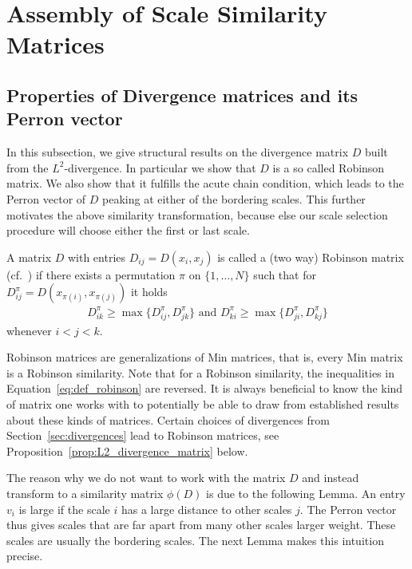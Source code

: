 
\section{Assembly of Scale Similarity Matrices}

\subsection{Properties of Divergence matrices and its Perron vector}

In this subsection, we give structural results on the divergence matrix $D$ built from the $L^2$-divergence. In particular we show that $D$ is a so called Robinson matrix. We also show that it fulfills the acute chain condition, which leads to the Perron vector of $D$ peaking at either of the bordering scales. This further motivates the above similarity transformation, because else our scale selection procedure will choose either the first or last scale.

\begin{Def}
    A matrix $D$ with entries $D_{ij}=D(x_i,x_j)$ is called a (two way) Robinson matrix (cf.~\cite{carmona_two_2024}) if there exists a permutation $\pi$ on $\{1,\dots,N\}$ such that for $D_{ij}^{\pi}=D(x_{\pi(i)},x_{\pi(j)})$ it holds
    \begin{align}\label{eq:def_robinson}
        D^{\pi}_{ik}\ge\max\{D^{\pi}_{ij},D^{\pi}_{jk}\}\text{ and }D_{ki}^{\pi}\ge\max\{D_{ji}^{\pi},D_{kj}^{\pi}\}
    \end{align}
    whenever $i<j<k$.
\end{Def}

Robinson matrices are generalizations of Min matrices, that is, every Min matrix is a Robinson similarity. Note that for a Robinson similarity, the inequalities in Equation~\eqref{eq:def_robinson} are reversed. It is always beneficial to know the kind of matrix one works with to potentially be able to draw from established results about these kinds of matrices. Certain choices of divergences from Section~\ref{sec:divergences} lead to Robinson matrices, see Proposition~\ref{prop:L2_divergence_matrix} below.

The reason why we do not want to work with the matrix $D$ and instead transform to a similarity matrix $\phi(D)$ is due to the following Lemma. An entry $v_i$ is large if the scale $i$ has a large distance to other scales $j$. The Perron vector thus gives scales that are far apart from many other scales larger weight. These scales are usually the bordering scales. The next Lemma makes this intuition precise.

